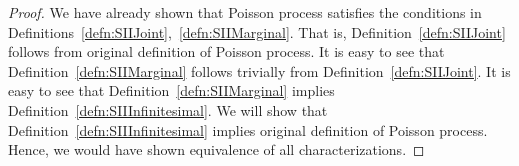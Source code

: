 \documentclass[a4paper,10pt]{article}
\theoremstyle{plain}
\theoremstyle{definition}
\begin{document}
\begin{proof}
We have already shown that Poisson process satisfies the conditions in Definitions~\ref{defn:SIIJoint},~\ref{defn:SIIMarginal}. That is, Definition~\ref{defn:SIIJoint} follows from original definition of Poisson process. It is easy to see that Definition~\ref{defn:SIIMarginal} follows trivially from Definition~\ref{defn:SIIJoint}. It is easy to see that Definition~\ref{defn:SIIMarginal} implies Definition~\ref{defn:SIIInfinitesimal}. We will show that Definition~\ref{defn:SIIInfinitesimal} implies original definition of Poisson process. Hence, we would have shown equivalence of all characterizations.
	

\end{proof}
\end{document}
